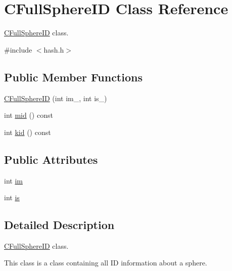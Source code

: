 \hypertarget{classCFullSphereID}{\section{C\-Full\-Sphere\-I\-D Class Reference}
\label{classCFullSphereID}
}


\hyperlink{classCFullSphereID}{C\-Full\-Sphere\-I\-D} class.  




{\ttfamily \#include $<$hash.\-h$>$}

\subsection*{Public Member Functions}
\begin{DoxyCompactItemize}
\item 
\hyperlink{classCFullSphereID_a19629df0afdd443b9caab10f89ea003e}{C\-Full\-Sphere\-I\-D} (int im\-\_\-, int is\-\_\-)
\item 
int \hyperlink{classCFullSphereID_a47e4f4ec9658b78cf19eb138b00387ae}{mid} () const 
\item 
int \hyperlink{classCFullSphereID_a92b739a3485beda70e2a20cca784fdef}{kid} () const 
\end{DoxyCompactItemize}
\subsection*{Public Attributes}
\begin{DoxyCompactItemize}
\item 
int \hyperlink{classCFullSphereID_a50ef0261eac4aa50470938544de904bf}{im}
\item 
int \hyperlink{classCFullSphereID_abfe8fd426e07fa9a9ebbeb3a9f21b498}{is}
\end{DoxyCompactItemize}


\subsection{Detailed Description}
\hyperlink{classCFullSphereID}{C\-Full\-Sphere\-I\-D} class. 

This class is a class containing all I\-D information about a sphere. 

